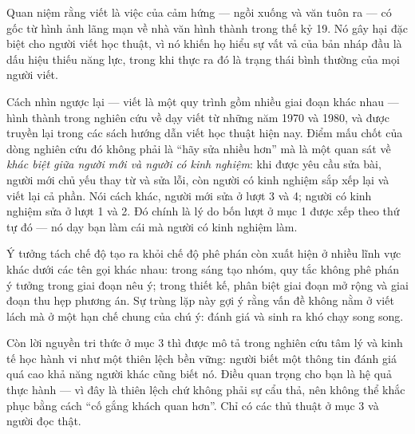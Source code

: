 \documentclass[../../english.tex]{subfiles}
\begin{document}
Quan niệm rằng viết là việc của cảm hứng --- ngồi xuống và văn tuôn ra --- có gốc từ hình ảnh lãng mạn về nhà văn hình thành trong thế kỷ 19. Nó gây hại đặc biệt cho người viết học thuật, vì nó khiến họ hiểu sự vất vả của bản nháp đầu là dấu hiệu thiếu năng lực, trong khi thực ra đó là trạng thái bình thường của mọi người viết.

Cách nhìn ngược lại --- viết là một quy trình gồm nhiều giai đoạn khác nhau --- hình thành trong nghiên cứu về dạy viết từ những năm 1970 và 1980, và được truyền lại trong các sách hướng dẫn viết học thuật hiện nay\cite{silvia2007,booth2016}. Điểm mấu chốt của dòng nghiên cứu đó không phải là ``hãy sửa nhiều hơn'' mà là một quan sát về \emph{khác biệt giữa người mới và người có kinh nghiệm}: khi được yêu cầu sửa bài, người mới chủ yếu thay từ và sửa lỗi, còn người có kinh nghiệm sắp xếp lại và viết lại cả phần. Nói cách khác, người mới sửa ở lượt 3 và 4; người có kinh nghiệm sửa ở lượt 1 và 2. Đó chính là lý do bốn lượt ở mục 1 được xếp theo thứ tự đó --- nó dạy bạn làm cái mà người có kinh nghiệm làm.

Ý tưởng tách chế độ tạo ra khỏi chế độ phê phán còn xuất hiện ở nhiều lĩnh vực khác dưới các tên gọi khác nhau: trong sáng tạo nhóm, quy tắc không phê phán ý tưởng trong giai đoạn nêu ý; trong thiết kế, phân biệt giai đoạn mở rộng và giai đoạn thu hẹp phương án. Sự trùng lặp này gợi ý rằng vấn đề không nằm ở viết lách mà ở một hạn chế chung của chú ý: đánh giá và sinh ra khó chạy song song.

Còn lời nguyền tri thức ở mục 3 thì được mô tả trong nghiên cứu tâm lý và kinh tế học hành vi như một thiên lệch bền vững\cite{pinker2014}: người biết một thông tin đánh giá quá cao khả năng người khác cũng biết nó. Điều quan trọng cho bạn là hệ quả thực hành --- vì đây là thiên lệch chứ không phải sự cẩu thả, nên không thể khắc phục bằng cách ``cố gắng khách quan hơn''. Chỉ có các thủ thuật ở mục 3 và người đọc thật.

\begin{gocre}
\end{gocre}
\end{document}
